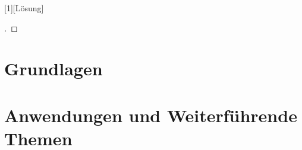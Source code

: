 \documentclass{book}
\begin{document}
\def\swallow#1{
}
[1][Lösung]{%
\begin{proof}[#1]%
\renewcommand{\qedsymbol}{$\bigcirc$}
\BODY
\end{proof}
}
\def\keineloesungen{%
\RenewEnviron{loesung}{\relax}
\RenewEnviron{bewertung}{\relax}
\RenewEnviron{diskussion}{\relax}
}
\newenvironment{beispiel}{%
\begin{proof}[Beispiel]%
\renewcommand{\qedsymbol}{$\bigcirc$}
}{\end{proof}}

\allowdisplaybreaks

\rhead{}
\tableofcontents
\newtheorem{satz}{Satz}[chapter]
\newtheorem{hilfssatz}[satz]{Hilfssatz}
\newtheorem{definition}[satz]{Definition}
\newtheorem{annahme}[satz]{Annahme}
\newtheorem{problem}[satz]{Problem}
\newtheorem*{problem*}{Problem}
\renewcommand{\floatpagefraction}{0.7}
\mainmatter

\part{Grundlagen}
\begin{refsection}

\begin{appendices}
%
%
\end{appendices}
\vfill
\pagebreak
\ifodd\value{page}\else\null\clearpage\fi
{}
\rhead{}
\printbibliography[heading=subbibliography]
\label{skript:literatur}
\end{refsection}

\part{Anwendungen und Weiterführende Themen}

\def\chapterauthor#1{{\large #1}\bigskip\bigskip}











\vfill
\pagebreak
\ifodd\value{page}\else\null\clearpage\fi
{}
\rhead{}

\end{document}
